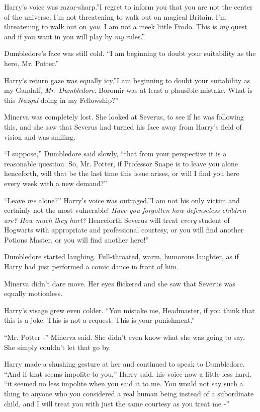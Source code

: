 Harry's voice was razor-sharp.''I regret to inform you that you are not
the center of the universe. I'm not threatening to walk out on magical
Britain. I'm threatening to walk out on \emph{you}. I am not a meek
little Frodo. This is \emph{my} quest and if you want in you will play
by \emph{my} rules.''

Dumbledore's face was still cold. ``I am beginning to doubt your
suitability as the hero, Mr. Potter.''

Harry's return gaze was equally icy.''I am beginning to doubt your
suitability as my Gandalf, \emph{Mr. Dumbledore}. Boromir was at least a
plausible mistake. What is this \emph{Nazgul} doing in my Fellowship?''

Minerva was completely lost. She looked at Severus, to see if he was
following this, and she saw that Severus had turned his face away from
Harry's field of vision and was smiling.

``I suppose,'' Dumbledore said slowly, ``that from your perspective it
is a reasonable question. So, Mr. Potter, if Professor Snape is to leave
you alone henceforth, will that be the last time this issue arises, or
will I find you here every week with a new demand?''

``Leave \emph{me} alone?'' Harry's voice was outraged.''I am not his only
victim and certainly not the most vulnerable! \emph{Have you forgotten
how defenseless children are? How much they hurt?} Henceforth Severus
will treat \emph{every} student of Hogwarts with appropriate and
professional courtesy, or you will find another Potions Master, or you
will find another hero!''

Dumbledore started laughing. Full-throated, warm, humorous laughter, as
if Harry had just performed a comic dance in front of him.

Minerva didn't dare move. Her eyes flickered and she saw that Severus
was equally motionless.

Harry's visage grew even colder. ``You mistake me, Headmaster, if you
think that this is a joke. This is not a request. This is your
punishment.''

``Mr. Potter -'' Minerva said. She didn't even know what she was going
to say. She simply couldn't let that go by.

Harry made a shushing gesture at her and continued to speak to
Dumbledore. ``And if that seems impolite to you,'' Harry said, his voice
now a little less hard, ``it seemed no less impolite when you said it to
me. You would not say such a thing to anyone who you considered a real
human being instead of a subordinate child, and I will treat you with
just the same courtesy as you treat me -''

